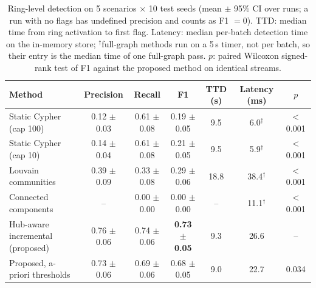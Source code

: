 \begin{table}[t]
\centering
\caption{Ring-level detection on 5 scenarios $\times$ 10 test seeds (mean $\pm$ 95\% CI over runs;
a run with no flags has undefined precision and counts as F1 $=0$). TTD: median time from ring activation to
first flag. Latency: median per-batch detection time on the in-memory store; $^\dagger$full-graph
methods run on a 5\,s timer, not per batch, so their entry is the median time of one full-graph pass. $p$: paired Wilcoxon signed-rank
test of F1 against the proposed method on identical streams.}
\label{tab:baselines}
\begin{tabular}{lcccccc}
\toprule
Method & Precision & Recall & F1 & TTD (s) & Latency (ms) & $p$ \\
\midrule
Static Cypher (cap 100) & 0.12 $\pm$ 0.03 & 0.61 $\pm$ 0.08 & 0.19 $\pm$ 0.05 & 9.5 & 6.0$^\dagger$ & $<$0.001 \\
Static Cypher (cap 10) & 0.14 $\pm$ 0.04 & 0.61 $\pm$ 0.08 & 0.21 $\pm$ 0.05 & 9.5 & 5.9$^\dagger$ & $<$0.001 \\
Louvain communities & 0.39 $\pm$ 0.09 & 0.33 $\pm$ 0.08 & 0.29 $\pm$ 0.06 & 18.8 & 38.4$^\dagger$ & $<$0.001 \\
Connected components & -- & 0.00 $\pm$ 0.00 & 0.00 $\pm$ 0.00 & -- & 11.1$^\dagger$ & $<$0.001 \\
Hub-aware incremental (proposed) & 0.76 $\pm$ 0.06 & 0.74 $\pm$ 0.06 & \textbf{0.73 $\pm$ 0.05} & 9.3 & 26.6 & -- \\
Proposed, a-priori thresholds & 0.73 $\pm$ 0.06 & 0.69 $\pm$ 0.06 & 0.68 $\pm$ 0.05 & 9.0 & 22.7 & 0.034 \\
\bottomrule
\end{tabular}
\end{table}
